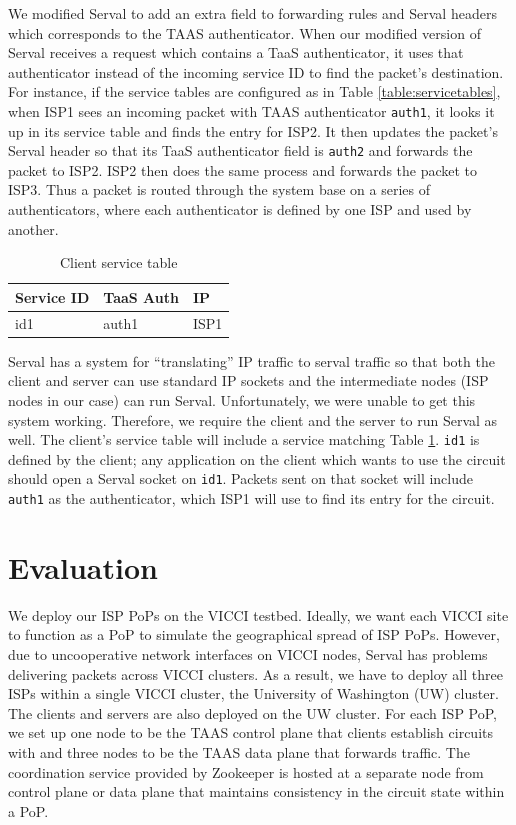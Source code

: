 \documentclass{article}
\begin{document}
We modified Serval to add an extra field to forwarding rules and
Serval headers which corresponds to the TAAS authenticator. When our
modified version of Serval receives a request which contains a TaaS
authenticator, it uses that authenticator instead of the incoming
service ID to find the packet's destination. For instance, if the
service tables are configured as in Table \ref{table:servicetables},
when ISP1 sees an incoming packet with TAAS authenticator
\texttt{auth1}, it looks it up in its service table and finds the
entry for ISP2. It then updates the packet's Serval header so that its
TaaS authenticator field is \texttt{auth2} and forwards the packet to
ISP2. ISP2 then does the same process and forwards the packet to
ISP3. Thus a packet is routed through the system base on a series of
authenticators, where each authenticator is defined by one ISP and
used by another.

\begin{table}
\centering
\begin{tabular}{| l | l | l | }
  \hline
  Service ID & TaaS Auth & IP \\ \hline
  id1 & auth1 & ISP1 \\ \hline
\end{tabular}
\caption{Client service table}
\label{table:clientservice}
\end{table}

Serval has a system for ``translating'' IP traffic to serval traffic
so that both the client and server can use standard IP sockets and the
intermediate nodes (ISP nodes in our case) can run
Serval. Unfortunately, we were unable to get this system
working. Therefore, we require the client and the server to run Serval
as well. The client's service table will include a service matching
Table \ref{table:clientservice}. \texttt{id1} is defined by the
client; any application on the client which wants to use the circuit
should open a Serval socket on \texttt{id1}. Packets sent on that
socket will include \texttt{auth1} as the authenticator, which ISP1
will use to find its entry for the circuit.

\section{Evaluation}

We deploy our ISP PoPs on the VICCI testbed.
Ideally, we want each VICCI site to function
as a PoP to simulate the geographical spread of ISP PoPs.
However, due to uncooperative network interfaces on VICCI nodes,
Serval has problems delivering packets across VICCI clusters.
As a result, we have to deploy all three ISPs within a single VICCI cluster,
 the University of Washington (UW) cluster. The clients and servers are also deployed
 on the UW cluster.
For each ISP PoP, we set up
one node to be the TAAS control plane that clients establish circuits with
and three nodes to be the TAAS data plane that forwards
traffic. The coordination service provided by Zookeeper is hosted
at a separate node from control plane or data plane that maintains consistency
in the circuit state within a PoP.
\end{document}
